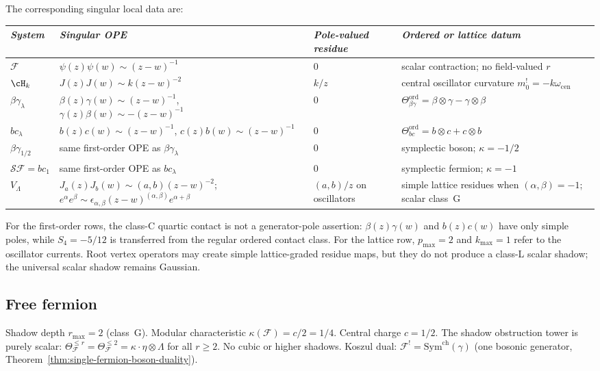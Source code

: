 The corresponding singular local data are:
\begin{center}
\scriptsize
\renewcommand{\arraystretch}{1.25}
\begin{tabular}{llll}
\toprule
\emph{System} & \emph{Singular OPE} & \emph{Pole-valued residue}
& \emph{Ordered or lattice datum} \\
\midrule
$\mathcal F$ &
$\psi(z)\psi(w)\sim (z-w)^{-1}$ &
$0$ &
scalar contraction; no field-valued $r$ \\
$\cH_k$ &
$J(z)J(w)\sim k(z-w)^{-2}$ &
$k/z$ &
central oscillator curvature $m_0^!=-k\omega_{\mathrm{cen}}$ \\
$\beta\gamma_\lambda$ &
$\beta(z)\gamma(w)\sim (z-w)^{-1}$,\;
$\gamma(z)\beta(w)\sim -(z-w)^{-1}$ &
$0$ &
$\Theta_{\beta\gamma}^{\mathrm{ord}}
=\beta\otimes\gamma-\gamma\otimes\beta$ \\
$bc_\lambda$ &
$b(z)c(w)\sim (z-w)^{-1}$,\;
$c(z)b(w)\sim (z-w)^{-1}$ &
$0$ &
$\Theta_{bc}^{\mathrm{ord}}=b\otimes c+c\otimes b$ \\
$\beta\gamma_{1/2}$ &
same first-order OPE as $\beta\gamma_\lambda$ &
$0$ &
symplectic boson; $\kappa=-1/2$ \\
$\mathcal{SF}=bc_1$ &
same first-order OPE as $bc_\lambda$ &
$0$ &
symplectic fermion; $\kappa=-1$ \\
$V_\Lambda$ &
$J_a(z)J_b(w)\sim (a,b)(z-w)^{-2}$;\;
$e^\alpha e^\beta\sim \epsilon_{\alpha,\beta}
(z-w)^{(\alpha,\beta)}e^{\alpha+\beta}$ &
$(a,b)/z$ on oscillators &
simple lattice residues when $(\alpha,\beta)=-1$; scalar class~G \\
\bottomrule
\end{tabular}
\end{center}
For the first-order rows, the class-C quartic contact is not a
generator-pole assertion: $\beta(z)\gamma(w)$ and $b(z)c(w)$ have only
simple poles, while $S_4=-5/12$ is transferred from the regular
ordered contact class. For the lattice row, $p_{\max}=2$ and
$k_{\max}=1$ refer to the oscillator currents. Root vertex operators
may create simple lattice-graded residue maps, but they do not produce
a class-L scalar shadow; the universal scalar shadow remains Gaussian.

\subsection{Free fermion}\label{sec:free-fermion}%
%

\begin{remark}
\label{rem:fermion-shadow-archetype}
Shadow depth $r_{\max} = 2$ (class~G).
Modular characteristic $\kappa(\mathcal{F}) = c/2 = 1/4$.
Central charge $c = 1/2$.
The shadow obstruction tower is purely scalar:
$\Theta_{\mathcal{F}}^{\leq r}
= \Theta_{\mathcal{F}}^{\leq 2}
= \kappa \cdot \eta \otimes \Lambda$
for all $r \geq 2$. No cubic or higher shadows.
Koszul dual: $\mathcal{F}^! = \mathrm{Sym}^{\mathrm{ch}}(\gamma)$
(one bosonic generator, Theorem~\ref{thm:single-fermion-boson-duality}).
\end{remark}

